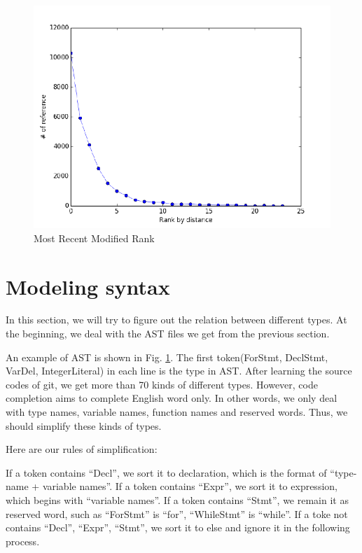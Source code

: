 \documentclass[prodmode,acmtecs]{acmsmall} %
\begin{document}
\begin{figure}
\centerline{\includegraphics[width=1\textwidth]{assign_rank_distance}}
\caption{Most Recent Modified Rank}
\label{fig:ast example}
\end{figure}


\section{Modeling syntax}
In this section, we will try to figure out the relation between different types. At the beginning, we deal with the AST files we get from the previous section. 

An example of AST is shown in Fig. \ref{fig:ast example}. The first token(ForStmt, DeclStmt, VarDel, IntegerLiteral) in each line is the type in AST. After learning the source codes of git\cite{torvalds2010git}, we get more than 70 kinds of different types. However, code completion aims to complete English word only. In other words, we only deal with type names, variable names, function names and reserved words. Thus, we should simplify these kinds of types. 

Here are our rules of simplification:

If a token contains “Decl”, we sort it to declaration, which is the format of “type-name + variable names”. If a token contains “Expr”, we sort it to expression, which begins with “variable names”. If a token contains “Stmt”, we remain it as reserved word, such as “ForStmt” is “for”, “WhileStmt” is “while”. If a toke not contains “Decl”, “Expr”, “Stmt”, we sort it to else and ignore it in the following process.
\end{document}
